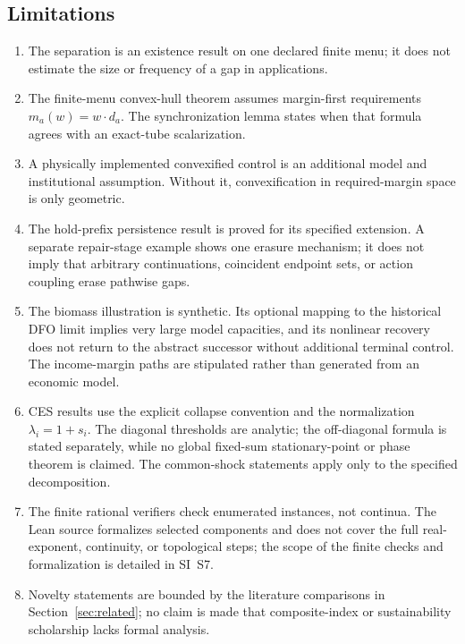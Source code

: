 \documentclass[preprint,11pt,authoryear]{elsarticle}
\theoremstyle{definition}
\theoremstyle{remark}
\begin{document}
\subsection{Limitations}\label{sec:limitations}

\begin{enumerate}[label=(\roman*),leftmargin=2em]
\item The separation is an existence result on one declared finite menu; it does not estimate the size or frequency of a gap in applications.
\item The finite-menu convex-hull theorem assumes margin-first requirements $m_a(w)=w\cdot d_a$. The synchronization lemma states when that formula agrees with an exact-tube scalarization.
\item A physically implemented convexified control is an additional model and institutional assumption. Without it, convexification in required-margin space is only geometric.
\item The hold-prefix persistence result is proved for its specified extension. A separate repair-stage example shows one erasure mechanism; it does not imply that arbitrary continuations, coincident endpoint sets, or action coupling erase pathwise gaps.
\item The biomass illustration is synthetic. Its optional mapping to the historical DFO limit implies very large model capacities, and its nonlinear recovery does not return to the abstract successor without additional terminal control. The income-margin paths are stipulated rather than generated from an economic model.
\item CES results use the explicit collapse convention and the normalization $\lambda_i=1+s_i$. The diagonal thresholds are analytic; the off-diagonal formula is stated separately, while no global fixed-sum stationary-point or phase theorem is claimed. The common-shock statements apply only to the specified decomposition.
\item The finite rational verifiers check enumerated instances, not continua. The Lean source formalizes selected components and does not cover the full real-exponent, continuity, or topological steps; the scope of the finite checks and formalization is detailed in SI~S7.
\item Novelty statements are bounded by the literature comparisons in Section~\ref{sec:related}; no claim is made that composite-index or sustainability scholarship lacks formal analysis.
\end{enumerate}
\end{document}
